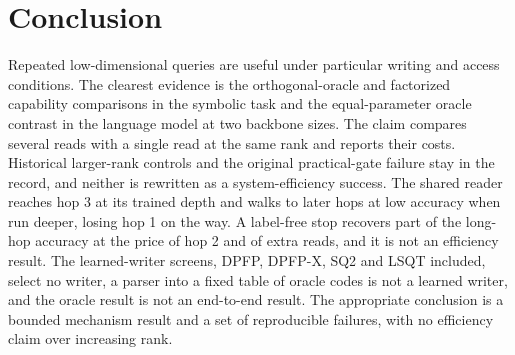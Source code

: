 \section{Conclusion}

Repeated low-dimensional queries are useful under particular writing and access conditions.
The clearest evidence is the orthogonal-oracle and factorized capability comparisons in the symbolic task and the equal-parameter oracle contrast in the language model at two backbone sizes.  %
The claim compares several reads with a single read at the same rank and reports their costs.  %
Historical larger-rank controls and the original practical-gate failure stay in the record, and neither is rewritten as a system-efficiency success.  %
The shared reader reaches hop 3 at its trained depth and walks to later hops at low accuracy when run deeper, losing hop 1 on the way.  %
A label-free stop recovers part of the long-hop accuracy at the price of hop 2 and of extra reads, and it is not an efficiency result.  %
The learned-writer screens, DPFP, DPFP-X, SQ2 and LSQT included, select no writer, a parser into a fixed table of oracle codes is not a learned writer, and the oracle result is not an end-to-end result.  %
The appropriate conclusion is a bounded mechanism result and a set of reproducible failures, with no efficiency claim over increasing rank.  %
